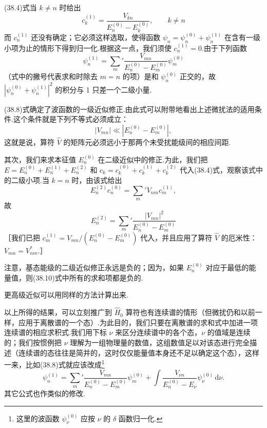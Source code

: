 (38.4)式当 $k\neq n$ 时给出
\begin{equation}
  c_k^{(1)}=\frac{V_{kn}}{E_n^{(0)}-E_k^{(0)}},\qquad k\neq n
\end{equation}
而 $c_n^{(1)}$ 还没有确定；它必须这样选取，使得函数 $\psi_n=\psi_n^{(0)}+\psi_n^{(1)}$ 在含有一级小项为止的情形下得到归一化.根据这一点，我们须使 $c_n^{(1)}=0$.由于下列函数
\begin{equation}
  \psi_n^{(1)}=\sum_m{}'\frac{V_{mn}}{E_n^{(0)}-E_m^{(0)}}\psi_m^{(0)}
\end{equation}
（式中的撇号代表求和时除去 $m=n$ 的项）是和 $\psi_n^{(0)}$ 正交的，故 $|\psi_n^{(0)}+\psi_n^{(1)}|^2$ 的积分与 1 只差一个二级小量.

(38.8)式确定了波函数的一级近似修正.由此式可以附带地看出上述微扰法的适用条件.这个条件就是下列不等式必须成立：
\begin{equation}
  |V_{mn}|\ll|E_n^{(0)}-E_m^{(0)}|,
\end{equation}
这就是说，算符 $\hat{V}$ 的矩阵元必须远小于那两个未受扰能级间的相应间距.

其次，我们来求本征值 $E_n^{(0)}$ 在二级近似中的修正.为此，我们把 $E=E_n^{(0)}+E_n^{(1)}+E_n^{(2)}$ 和 $c_k=c_k^{(0)}+c_k^{(1)}+c_k^{(2)}$ 代入(38.4)式，观察该式中的二级小项.当 $k=n$ 时，由该式给出
\begin{equation*}
  E_n^{(2)}c_n^{(0)}=\sum_m{}'V_{nm}c_m^{(1)},
\end{equation*}
故
\begin{equation}
  E_n^{(2)}=\sum_m{}'\frac{|V_{mn}|^2}{E_n^{(0)}-E_m^{(0)}}
\end{equation}
［我们已把 $c_m^{(1)}=V_{mn}/\left(E_n^{(0)}-E_m^{(0)}\right)$ 代入，并且应用了算符 $\hat{V}$ 的厄米性：$V_{mn}=V_{nm}^{*}$.］

注意，基态能级的二级近似修正永远是负的；因为，如果 $E_n^{(0)}$ 对应于最低的能量值，则(38.10)式中所有的求和项都是负的.

更高级近似可以用同样的方法计算出来.

以上所得的结果，可以立刻推广到 $\hat{H}_0$ 算符也有连续谱的情形（但微扰仍和以前一样，应用于离散谱的一个态）.为此目的，我们只要在离散谱的求和式中加进一项连续谱的相应求积式.我们用下标 $\nu$ 来区分连续谱中的各个态，$\nu$ 的值域是连续的；我们按惯例把 $\nu$ 理解为一组物理量的数值，这组数值足以对该态进行完全描述（连续谱的态往往是简并的，这时仅仅能量值本身还不足以确定这个态），这样一来，比如(38.8)式就应该改成\footnote{这里的波函数 $\psi_\nu^{(0)}$ 应按 $\nu$ 的 $\delta$ 函数归一化.}
\begin{equation}
  \psi_n^{(1)}=\sum_m{}'\frac{V_{mn}}{E_n^{(0)}-E_m^{(0)}}\psi_m^{(0)}
  +\int\frac{V_{\nu n}}{E_n^{(0)}-E_\nu}\psi_\nu^{(0)}\,\mathrm{d}\nu.
\end{equation}
其它公式也作类似的修改.

